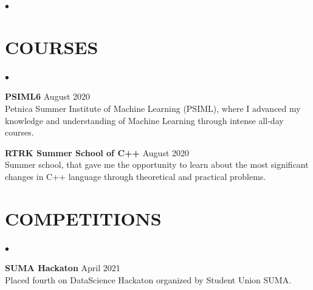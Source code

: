 \documentclass[margin,center]{res}
\newenvironment{list2}{
  \begin{list}{$\bullet$}{%
      \setlength{\itemsep}{0in}
      \setlength{\parsep}{0in} \setlength{\parskip}{0in}
      \setlength{\topsep}{0in} \setlength{\partopsep}{0in}
      \setlength{\leftmargin}{0.2in}}}{\end{list}}
\begin{document}
\begin{resume}
\begin{list2}
\end{list2}

\section{COURSES}
\begin{list2}
  \item {\bf PSIML6} \hfill August 2020\\
    Petnica Summer Institute of Machine Learning (PSIML), where I
    advanced my knowledge and understanding of Machine Learning
    through intense all-day courses.

  \item {\bf RTRK Summer School of C++} \hfill August 2020\\
    Summer school, that gave me the opportunity to learn about the
    most significant changes in C++ language through theoretical and
    practical problems.

\end{list2}


\section{COMPETITIONS}
\begin{list2}
\item{\bf SUMA Hackaton} \hfill April 2021\\
  Placed fourth on DataScience Hackaton organized by Student Union SUMA.
\end{list2}

\end{resume}
\end{document}
